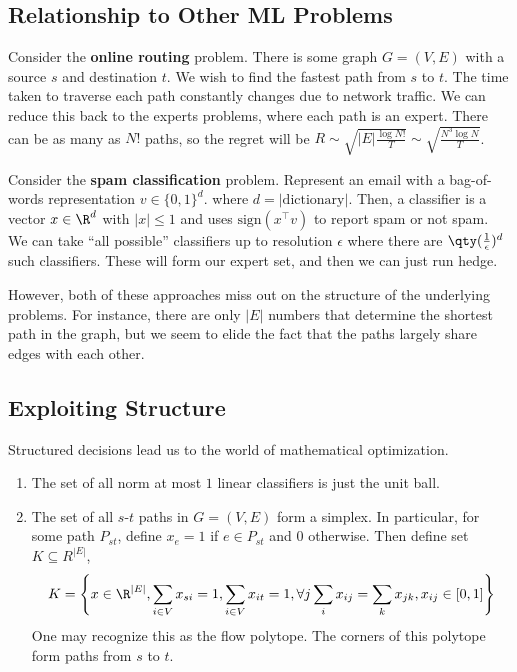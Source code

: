 \subsection{Relationship to Other ML Problems}
Consider the \textbf{online routing} problem. There is some graph $G = (V, E)$
with a source $s$ and destination $t$. We wish to find the fastest path from $s$ to $t$.
The time taken to traverse each path constantly changes due to network traffic.
We can reduce this back to the experts problems, where each path is an expert.
There can be as many as $N!$ paths, so the regret will be $R \sim \sqrt{|E| \frac{\log N!}{T}} \sim \sqrt{\frac{N^3 \log N}{T}}$.

Consider the \textbf{spam classification} problem.
Represent an email with a bag-of-words representation $v \in \{0, 1\}^{d}$.
where $d = |\text{dictionary}|$. Then, a classifier
is a vector $x \in \R^d$ with $|x| \le 1$ and uses $\text{sign}(x^{\top} v)$
to report spam or not spam. We can take ``all possible''
classifiers up to resolution $\epsilon$ where
there are $\qty(\frac{1}{\epsilon})^{d}$ such classifiers. These
will form our expert set, and then we can just run hedge.

However, both of these approaches miss out on the structure of the underlying problems.
For instance, there are only $|E|$ numbers that determine the shortest path in the graph,
but we seem to elide the fact that the paths largely share edges with each other.

\subsection{Exploiting Structure}
Structured decisions lead us to the world of mathematical optimization.
\begin{enumerate}
\item The set of all norm at most $1$ linear classifiers is
just the unit ball.
\item The set of all $s$-$t$ paths in $G = (V, E)$ form a simplex.
In particular, for some path $P_{st}$, define $x_e = 1$ if $e \in P_{st}$ 
and $0$ otherwise. Then define set $K \subseteq R^{|E|}$,
\[ K = \left\{ x\in \R^{|E|}, \sum_{i \in V} x_{si} = 1, \sum_{i \in V} x_{it} = 1, \forall j \sum_i x_{ij} = \sum_{k} x_{jk}, x_{ij} \in [0, 1]\right\} \]
One may recognize this as the flow polytope. The corners of this polytope form paths from $s$ to $t$.
\end{enumerate}
